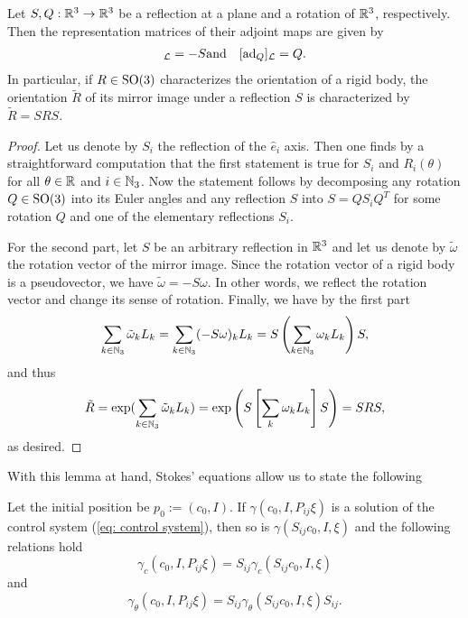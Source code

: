 \begin{lemma}
\label{lem:mirror image of orientation}
Let $S, Q:\mathbb{R}^3 \to \mathbb{R}^3$ be a reflection at a plane and a rotation of $\mathbb{R}^3$, respectively. Then the representation matrices of their adjoint maps are given by
\begin{eqnarray}
[\ad_{S}]_{\mathcal{L}} = -S & \text{and}  & [\ad_{Q}]_{\mathcal{L}} = Q.
\end{eqnarray}
In particular, if $R \in \operatorname{SO}(3)$ characterizes the orientation of a rigid body, the orientation $\tilde{R}$ of its mirror image under a reflection $S$ is characterized by $\tilde{R} = SRS$.
\end{lemma}

\begin{proof}
Let us denote by $S_i$ the reflection of the $\hat{e}_i$ axis. Then one finds by a straightforward computation that the first statement is true for $S_i$ and $R_i(\theta)$ for all $\theta \in \mathbb{R}$ and $i \in \mathbb{N}_3$. Now the statement follows by decomposing any rotation $Q \in \operatorname{SO}(3)$ into its Euler angles and any reflection $S$ into $S = Q S_i Q^{T}$ for some rotation $Q$ and one of the elementary reflections $S_i$.

For the second part, let $S$ be an arbitrary reflection in $\mathbb{R}^3$ and let us denote by $\tilde{\omega}$ the rotation vector of the mirror image. Since the rotation vector of a rigid body is a pseudovector, we have $\tilde{\omega} = -S\omega$. In other words, we reflect the rotation vector and change its sense of rotation. Finally, we have by the first part
\begin{align}
	\sum_{k \in \mathbb{N}_3} \tilde{\omega}_k L_k = \sum_{k \in \mathbb{N}_3}(- S \omega)_k L_k = S \left (\sum_{k \in \mathbb{N}_3} \omega_k L_k\right ) S,
\end{align}
and thus
\begin{equation}
\tilde{R} = \exp(\sum_{k \in \mathbb{N}_3} \tilde{\omega}_k L_k) = \exp \left (S \left [\sum_{k} \omega_k L_k \right ] S \right ) = S R S,
\end{equation}
as desired.
\end{proof}

With this lemma at hand, Stokes' equations allow us to state the following

\begin{condition}
\label{cond:swap}
Let the initial position be $p_0 := (c_0, I)$. If $\gamma(c_0, I, P_{ij} \xi)$ is a solution of the control system (\ref{eq: control system}), then so is $\gamma(S_{ij}c_0, I, \xi)$ and the following relations hold
\begin{equation}
	\gamma_c(c_0, I, P_{ij} \xi) = S_{ij} \gamma_c(S_{ij}c_0, I, \xi)
\end{equation}
and
\begin{equation}
	\gamma_{\theta}(c_0, I, P_{ij} \xi ) = S_{ij} \gamma_{\theta} (S_{ij} c_0, I, \xi) S_{ij}.
\end{equation}
\end{condition}


